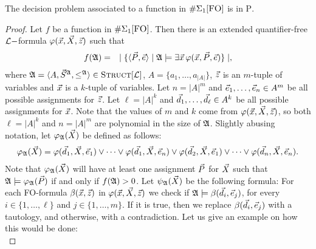 \begin{theo} \label{decisionptime}
The decision problem associated to a function in $\E1$ is in \textsc{P}.
\end{theo}
\begin{proof}
Let $f$ be a function in $\E1$. Then there is an extended quantifier-free $\L-$formula $\varphi(\x,\X,\z)$ such that
\begin{eqnarray*}
f(\A) &=& \mid \{ \langle\P,\e\rangle \mid \A \models \exists \x \, \varphi(\x,\P,\e) \} \mid,
\end{eqnarray*}
where $\A = \langle A, \S^{\A}, \leq^{\A} \rangle \in \Truc$, $A = \{a_1,\ldots,a_{\vert A \vert}\}$, $\z$ is an $m$-tuple of variables and $\x$ is a $k$-tuple of variables. Let $n = \vert A \vert^m$ and $\e_1,\dots,\e_n \in A^m$ be all possible assignments for $\z$. Let $\ell = \vert A \vert^k$ and $\d_1,\dots,\d_\ell\in A^k$ be all possible assignments for $\x$. Note that the values of $m$ and $k$ come from $\varphi(\x,\X,\z)$, so both $\ell = \vert A \vert^k$ and $n=\vert A \vert^m$ are polynomial in the size of $\A$. Slightly abusing notation, let $\varphi_\A(\X)$ be defined as follows:
\begin{eqnarray*}
\varphi_\A(\X) = \varphi(\d_1,\X,\e_1) \vee \cdots \vee \varphi(\d_1,\X,\e_n) \vee \varphi(\d_2,\X,\e_1) \vee \cdots \vee \varphi(\d_n,\X,\e_n).
\end{eqnarray*}
Note that $\varphi_\A(\X)$ will have at least one assignment $\P$ for $\X$ such that $\A\models\varphi_\A(\P)$ if and only if $f(\A)>0$. Let $\psi_\A(\X)$ be the following formula: For each FO-formula $\beta(\x,\z)$ in $\varphi(\x,\X,\z)$ we check if $\A \models \beta(\d_i,\e_j)$, for every $i\in\{1,\ldots,\ell\}$ and $j\in\{1,\ldots,m\}$. If it is true, then we replace $\beta(\d_i,\e_j)$ with a tautology, and otherwise, with a contradiction. Let us give an example on how this would be done: \\


\end{proof}
